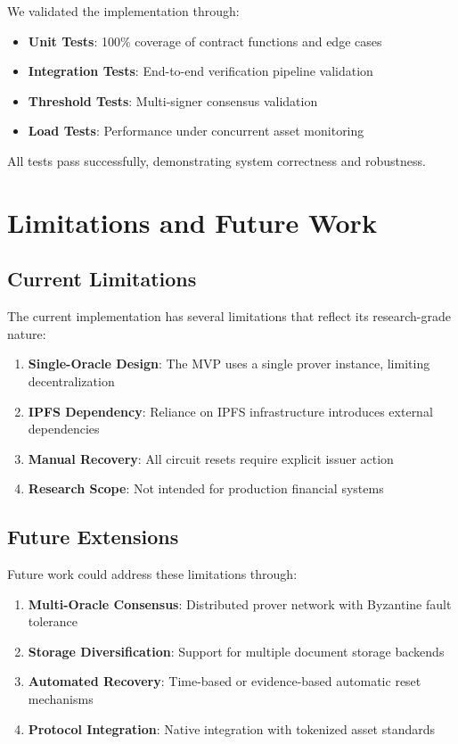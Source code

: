 \documentclass[10pt,conference]{IEEEtran}
\begin{document}
We validated the implementation through:
\begin{itemize}
\item \textbf{Unit Tests}: 100\% coverage of contract functions and edge cases
\item \textbf{Integration Tests}: End-to-end verification pipeline validation
\item \textbf{Threshold Tests}: Multi-signer consensus validation
\item \textbf{Load Tests}: Performance under concurrent asset monitoring
\end{itemize}

All tests pass successfully, demonstrating system correctness and robustness.

\section{Limitations and Future Work}
\label{sec:limitations}

\subsection{Current Limitations}
\label{subsec:current_limitations}

The current implementation has several limitations that reflect its research-grade nature:

\begin{enumerate}
\item \textbf{Single-Oracle Design}: The MVP uses a single prover instance, limiting decentralization
\item \textbf{IPFS Dependency}: Reliance on IPFS infrastructure introduces external dependencies
\item \textbf{Manual Recovery}: All circuit resets require explicit issuer action
\item \textbf{Research Scope}: Not intended for production financial systems
\end{enumerate}

\subsection{Future Extensions}
\label{subsec:future_extensions}

Future work could address these limitations through:

\begin{enumerate}
\item \textbf{Multi-Oracle Consensus}: Distributed prover network with Byzantine fault tolerance
\item \textbf{Storage Diversification}: Support for multiple document storage backends
\item \textbf{Automated Recovery}: Time-based or evidence-based automatic reset mechanisms
\item \textbf{Protocol Integration}: Native integration with tokenized asset standards
\end{enumerate}
\end{document}
